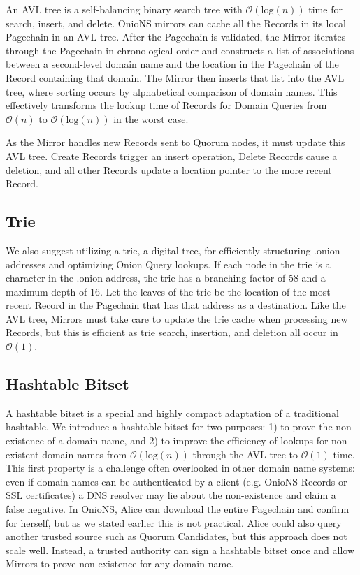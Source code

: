 An AVL tree is a self-balancing binary search tree with $ \mathcal{O}(\mathrm{log}(n)) $ time for search, insert, and delete. OnioNS mirrors can cache all the Records in its local Pagechain in an AVL tree. After the Pagechain is validated, the Mirror iterates through the Pagechain in chronological order and constructs a list of associations between a second-level domain name and the location in the Pagechain of the Record containing that domain. The Mirror then inserts that list into the AVL tree, where sorting occurs by alphabetical comparison of domain names. This effectively transforms the lookup time of Records for Domain Queries from $ \mathcal{O}(n) $ to $ \mathcal{O}(\mathrm{log}(n)) $ in the worst case.

As the Mirror handles new Records sent to Quorum nodes, it must update this AVL tree. Create Records trigger an insert operation, Delete Records cause a deletion, and all other Records update a location pointer to the more recent Record.


\subsection{Trie}

We also suggest utilizing a trie, a digital tree, for efficiently structuring .onion addresses and optimizing Onion Query lookups. If each node in the trie is a character in the .onion address, the trie has a branching factor of 58 and a maximum depth of 16. Let the leaves of the trie be the location of the most recent Record in the Pagechain that has that address as a destination. Like the AVL tree, Mirrors must take care to update the trie cache when processing new Records, but this is efficient as trie search, insertion, and deletion all occur in $ \mathcal{O}(1) $.

\subsection{Hashtable Bitset}
\label{sec:HashtableBitset}

A hashtable bitset is a special and highly compact adaptation of a traditional hashtable. We introduce a hashtable bitset for two purposes: 1) to prove the non-existence of a domain name, and 2) to improve the efficiency of lookups for non-existent domain names from $ \mathcal{O}(\mathrm{log}(n)) $ through the AVL tree to $ \mathcal{O}(1) $ time. This first property is a challenge often overlooked in other domain name systems: even if domain names can be authenticated by a client (e.g. OnioNS Records or SSL certificates) a DNS resolver may lie about the non-existence and claim a false negative. In OnioNS, Alice can download the entire Pagechain and confirm for herself, but as we stated earlier this is not practical. Alice could also query another trusted source such as Quorum Candidates, but this approach does not scale well. Instead, a trusted authority can sign a hashtable bitset once and allow Mirrors to prove non-existence for any domain name.


